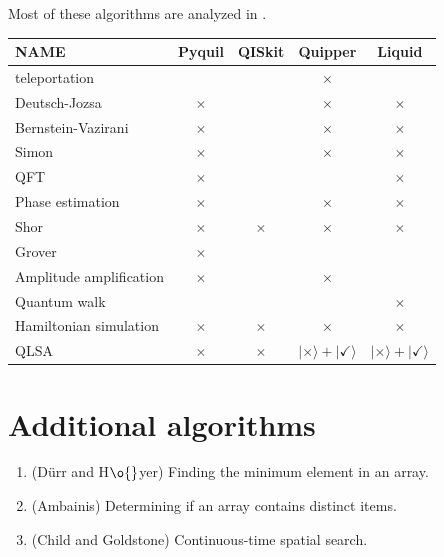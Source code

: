 \documentclass[a4paper,10pt]{article}
\newcommand{\yup}{\checkmark}
\newcommand{\nup}{$\times$}
\newcommand{\nyup}{\mbox{$\ket{\times} + \ket{\yup}$}}
\newcommand{\ket}[1]{| #1 \rangle}
\begin{document}
Most of these algorithms are analyzed in \cite{NC00}.

\bigskip

\begin{tabular}{|l||c|c|c|c||} \hline
NAME						& Pyquil& QISkit& Quipper& Liquid \\ \hline \hline
teleportation 				& \yup	& \yup	& \nup	& \yup \\ \hline \hline
Deutsch-Jozsa				& \nup	& \yup	& \nup	& \nup \\ \hline
Bernstein-Vazirani			& \nup	& \yup	& \nup	& \nup \\ \hline
Simon						& \nup	& \yup	& \nup	& \nup \\ \hline \hline
QFT							& \nup	& \yup	& \yup	& \nup \\ \hline
Phase estimation			& \nup	& \yup	& \nup	& \nup \\ \hline
Shor						& \nup	& \nup	& \nup	& \nup \\ \hline \hline
Grover						& \nup	& \yup	& \yup	& \yup \\ \hline \hline
Amplitude amplification		& \nup	& \yup	& \nup	& \yup \\ \hline \hline
Quantum walk				& \yup	& \yup	& \yup	& \nup \\ \hline \hline
Hamiltonian simulation		& \nup	& \nup	& \nup	& \nup \\ \hline
QLSA						& \nup	& \nup	& \nyup	& \nyup \\ \hline \hline
\end{tabular}

\bigskip

\section{Additional algorithms}

\begin{enumerate}
\item (D\"{u}rr and H$\o{}$yer) Finding the minimum element in an array.

\item (Ambainis) Determining if an array contains distinct items.

\item (Child and Goldstone) Continuous-time spatial search.

\end{enumerate}
\end{document}
